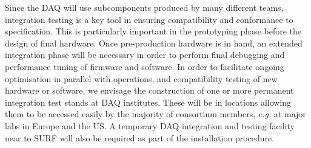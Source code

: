 Since the DAQ will use subcomponents produced by many different teams,
integration testing is a key tool in ensuring compatibility and
conformance to specification. This is particularly important in the
prototyping phase before the design of final hardware. Once
pre-production hardware is in hand, an extended integration phase will
be necessary in order to perform final debugging and performance tuning
of firmware and software. In order to facilitate ongoing optimisation in
parallel with operations, and compatibility testing of new hardware or
software, we envisage the construction of one or more permanent
integration test stands at DAQ institutes. These will be in locations
allowing them to be accessed easily by the majority of consortium
members, {\it e.g.} at major labs in Europe and the US. A temporary DAQ
integration and testing facility near to SURF will also be required as
part of the installation procedure.

